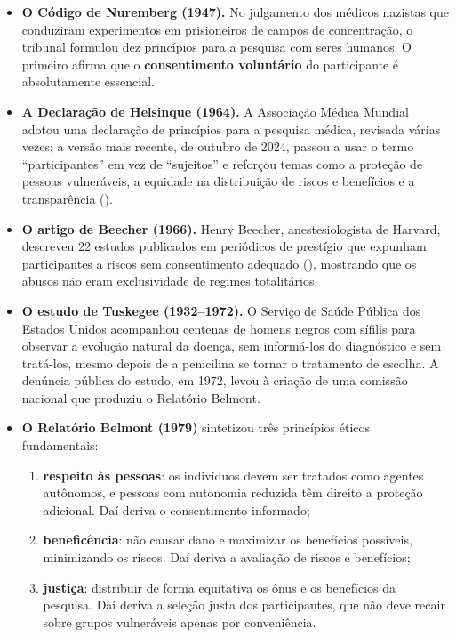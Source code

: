 \documentclass[
]{book}
\providecommand{\tightlist}{%
  \setlength{\itemsep}{0pt}\setlength{\parskip}{0pt}}
\begin{document}
\begin{itemize}
\tightlist
\item
  \textbf{O Código de Nuremberg (1947).} No julgamento dos médicos nazistas que conduziram experimentos em prisioneiros de campos de concentração, o tribunal formulou dez princípios para a pesquisa com seres humanos. O primeiro afirma que o \textbf{consentimento voluntário} do participante é absolutamente essencial.
\item
  \textbf{A Declaração de Helsinque (1964).} A Associação Médica Mundial adotou uma declaração de princípios para a pesquisa médica, revisada várias vezes; a versão mais recente, de outubro de 2024, passou a usar o termo ``participantes'' em vez de ``sujeitos'' e reforçou temas como a proteção de pessoas vulneráveis, a equidade na distribuição de riscos e benefícios e a transparência ().
\item
  \textbf{O artigo de Beecher (1966).} Henry Beecher, anestesiologista de Harvard, descreveu 22 estudos publicados em periódicos de prestígio que expunham participantes a riscos sem consentimento adequado (), mostrando que os abusos não eram exclusividade de regimes totalitários.
\item
  \textbf{O estudo de Tuskegee (1932--1972).} O Serviço de Saúde Pública dos Estados Unidos acompanhou centenas de homens negros com sífilis para observar a evolução natural da doença, sem informá-los do diagnóstico e sem tratá-los, mesmo depois de a penicilina se tornar o tratamento de escolha. A denúncia pública do estudo, em 1972, levou à criação de uma comissão nacional que produziu o Relatório Belmont.
\item
  \textbf{O Relatório Belmont (1979)} sintetizou três princípios éticos fundamentais:

  \begin{enumerate}
  \def\labelenumi{\arabic{enumi}.}
  \tightlist
  \item
    \textbf{respeito às pessoas}: os indivíduos devem ser tratados como agentes autônomos, e pessoas com autonomia reduzida têm direito a proteção adicional. Daí deriva o consentimento informado;
  \item
    \textbf{beneficência}: não causar dano e maximizar os benefícios possíveis, minimizando os riscos. Daí deriva a avaliação de riscos e benefícios;
  \item
    \textbf{justiça}: distribuir de forma equitativa os ônus e os benefícios da pesquisa. Daí deriva a seleção justa dos participantes, que não deve recair sobre grupos vulneráveis apenas por conveniência.
  \end{enumerate}
\end{itemize}
\end{document}
